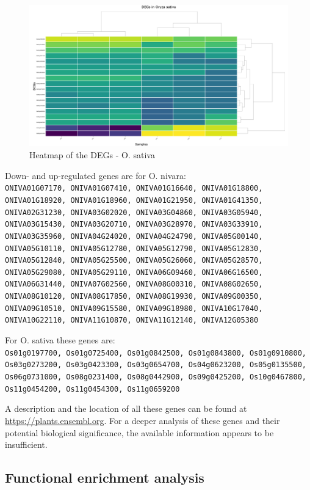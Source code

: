 \begin{figure}[htbp]
    \caption{Heatmap of the DEGs - O. sativa}
    \label{fig:4.4-DEG-Heatmap-Oryza_sativa}
    \includegraphics[width=\textwidth]{../../results/plots-and-tables/4.4-DEG-Heatmap-Oryza_sativa}
\end{figure}

\filbreak
Down- and up-regulated genes are for O. nivara:\\
{\scriptsize\texttt{ONIVA01G07170, ONIVA01G07410, ONIVA01G16640, ONIVA01G18800, ONIVA01G18920, ONIVA01G18960, ONIVA01G21950, ONIVA01G41350, ONIVA02G31230, ONIVA03G02020, ONIVA03G04860, ONIVA03G05940, ONIVA03G15430, ONIVA03G20710, ONIVA03G28970, ONIVA03G33910, ONIVA03G35960, ONIVA04G24020, ONIVA04G24790, ONIVA05G00140, ONIVA05G10110, ONIVA05G12780, ONIVA05G12790, ONIVA05G12830, ONIVA05G12840, ONIVA05G25500, ONIVA05G26060, ONIVA05G28570, ONIVA05G29080, ONIVA05G29110, ONIVA06G09460, ONIVA06G16500, ONIVA06G31440, ONIVA07G02560, ONIVA08G00310, ONIVA08G02650, ONIVA08G10120, ONIVA08G17850, ONIVA08G19930, ONIVA09G00350, ONIVA09G10510, ONIVA09G15580, ONIVA09G18980, ONIVA10G17040, ONIVA10G22110, ONIVA11G10870, ONIVA11G12140, ONIVA12G05380
}}

For O. sativa these genes are:\\
{\scriptsize\texttt{Os01g0197700, Os01g0725400, Os01g0842500, Os01g0843800, Os01g0910800, Os03g0273200, Os03g0423300, Os03g0654700, Os04g0623200, Os05g0135500, Os06g0731000, Os08g0231400, Os08g0442900, Os09g0425200, Os10g0467800, Os11g0454200, Os11g0454300, Os11g0659200
}}

A description and the location of all these genes can be found at \url{https://plants.ensembl.org}. For a deeper analysis of these genes and their potential biological significance, the available information appears to be insufficient.


\subsection{Functional enrichment analysis}

